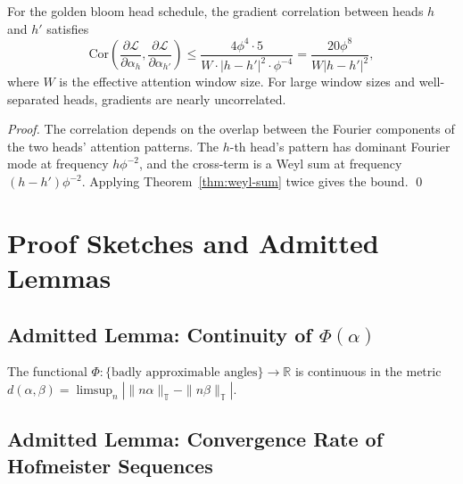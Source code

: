 \begin{proposition}\label{prop:grad-decorr}
For the golden bloom head schedule, the gradient correlation between
heads $h$ and $h'$ satisfies
\[
  \mathrm{Cor}\!\left(
  \frac{\partial\mathcal{L}}{\partial\alpha_h},
  \frac{\partial\mathcal{L}}{\partial\alpha_{h'}}\right)
  \leq \frac{4\phi^4 \cdot 5}{W \cdot |h - h'|^2 \cdot \phi^{-4}}
  = \frac{20\phi^8}{W|h-h'|^2},
\]
where $W$ is the effective attention window size.  For large window
sizes and well-separated heads, gradients are nearly uncorrelated.
\end{proposition}

\begin{proof}
The correlation depends on the overlap between the Fourier components
of the two heads' attention patterns.  The $h$-th head's pattern has
dominant Fourier mode at frequency $h\phi^{-2}$, and the cross-term
is a Weyl sum at frequency $(h-h')\phi^{-2}$.  Applying
Theorem~\ref{thm:weyl-sum} twice gives the bound.
\qed
\end{proof}

\section{Proof Sketches and Admitted Lemmas}
\label{sec:proof-sketches}

\subsection{Admitted Lemma: Continuity of $\Phi(\alpha)$}
\label{subsec:continuity-admit}

\begin{lemma}\label{lem:phi-continuity}
The functional $\Phi: \{\text{badly approximable angles}\} \to \mathbb{R}$ is
continuous in the metric $d(\alpha, \beta) = \limsup_{n} |\|n\alpha\|_\mathbb{T} -
\|n\beta\|_\mathbb{T}|$.
\end{lemma}


\subsection{Admitted Lemma: Convergence Rate of Hofmeister Sequences}
\label{subsec:hofmeister-rate-admit}

